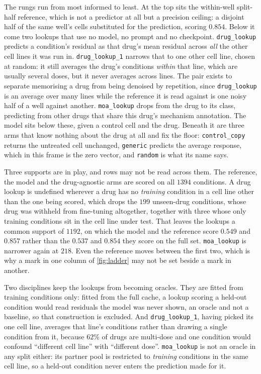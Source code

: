 The rungs run from most informed to least. At the top sits the within-well
split-half reference, which is not a predictor at all but a precision ceiling: a
disjoint half of the same well's cells substituted for the prediction, scoring
$0.854$. Below it come two lookups that use no model, no prompt and no checkpoint.
\texttt{drug\_lookup} predicts a condition's residual as that drug's mean residual
across \emph{all} the other cell lines it was run in. \texttt{drug\_lookup\_1}
narrows that to one other cell line, chosen at random: it still averages the
drug's conditions \emph{within} that line, which are usually several doses, but it
never averages across lines. The pair exists to separate memorising a drug from
being denoised by repetition, since \texttt{drug\_lookup} is an average over many
lines while the reference it is read against is one noisy half of a well against
another. \texttt{moa\_lookup} drops
from the drug to its class, predicting from other drugs that share this drug's
mechanism annotation. The model sits below these, given a control cell and the
drug. Beneath it are three arms that know nothing about the drug at all and fix
the floor: \texttt{control\_copy} returns the untreated cell unchanged,
\texttt{generic} predicts the average response, which in this frame is the zero
vector, and \texttt{random} is what its name says.

Three supports are in play, and rows may not be read across them. The reference,
the model and the drug-agnostic arms are scored on all $\num{1394}$ conditions.
A drug lookup is undefined wherever a drug has no
\emph{training} condition in a cell line other than the one being scored, which
drops the $\num{199}$ unseen-drug conditions, whose drug was withheld from
fine-tuning altogether, together with three whose only training conditions sit in
the cell line under test. That leaves the lookups a common support of
$\num{1192}$, on which the model and the reference score $0.549$ and $0.857$
rather than the $0.537$ and $0.854$ they score on the full set.
\texttt{moa\_lookup} is narrower again at $\num{218}$. Even
the reference moves between the first two, which is why a mark in one column of
\cref{fig:ladder} may not be set beside a mark in another.

Two disciplines keep the lookups from becoming oracles. They are fitted from
training conditions only: fitted from the full cache, a lookup scoring a held-out
condition would read residuals the model was never shown, an oracle and not a
baseline, so that construction is excluded. And \texttt{drug\_lookup\_1}, having
picked its one cell line, averages that line's conditions rather than drawing a
single condition from it, because $62\%$ of drugs are multi-dose and one condition
would confound ``different cell line'' with ``different dose''. \texttt{moa\_lookup} is not an oracle in any split either: its
partner pool is restricted to \emph{training} conditions in the same cell line, so
a held-out condition never enters the prediction made for it.

